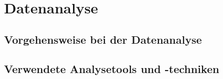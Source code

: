 \section{Datenanalyse}
\label{ch_05Datenanalyse}

\subsection{Vorgehensweise bei der Datenanalyse}
\label{ch_05Vorgehensweise bei der Datenanalyse}
\subsection{Verwendete Analysetools und -techniken}
\label{ch_05Verwendete Analysetools und -techniken}
